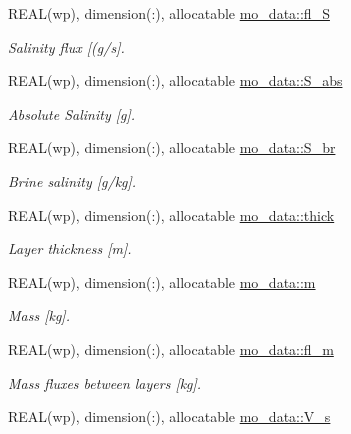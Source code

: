 \begin{DoxyCompactItemize}
REAL(wp), dimension(:), allocatable \hyperlink{namespacemo__data_a43d6e453737affa893b8a861be921f5d}{mo\_\-data::fl\_\-S}
\begin{DoxyCompactList}\small\item\em Salinity flux \mbox{[}(g/s\mbox{]}. \item\end{DoxyCompactList}\item 
REAL(wp), dimension(:), allocatable \hyperlink{namespacemo__data_a1bc8433ee56482cce780b7630ab22867}{mo\_\-data::S\_\-abs}
\begin{DoxyCompactList}\small\item\em Absolute Salinity \mbox{[}g\mbox{]}. \item\end{DoxyCompactList}\item 
REAL(wp), dimension(:), allocatable \hyperlink{namespacemo__data_aa70fa9ad64d25cd4c15584fbc834d820}{mo\_\-data::S\_\-br}
\begin{DoxyCompactList}\small\item\em Brine salinity \mbox{[}g/kg\mbox{]}. \item\end{DoxyCompactList}\item 
REAL(wp), dimension(:), allocatable \hyperlink{namespacemo__data_a1409d49184dc3835ab1186dde372d381}{mo\_\-data::thick}
\begin{DoxyCompactList}\small\item\em Layer thickness \mbox{[}m\mbox{]}. \item\end{DoxyCompactList}\item 
REAL(wp), dimension(:), allocatable \hyperlink{namespacemo__data_af1813881649730f758278713d7d72d18}{mo\_\-data::m}
\begin{DoxyCompactList}\small\item\em Mass \mbox{[}kg\mbox{]}. \item\end{DoxyCompactList}\item 
REAL(wp), dimension(:), allocatable \hyperlink{namespacemo__data_ac4fb31397da08679eac0e3089b60447a}{mo\_\-data::fl\_\-m}
\begin{DoxyCompactList}\small\item\em Mass fluxes between layers \mbox{[}kg\mbox{]}. \item\end{DoxyCompactList}\item 
REAL(wp), dimension(:), allocatable \hyperlink{namespacemo__data_a77750b1536deb5ddd2ebada202f1cf18}{mo\_\-data::V\_\-s}

\end{DoxyCompactItemize}
